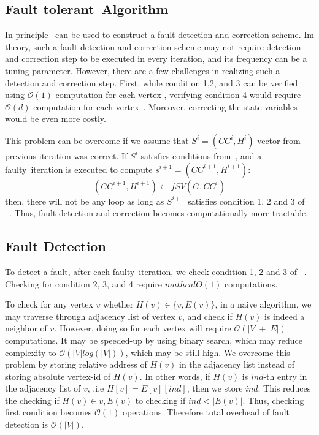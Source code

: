 \subsection{Fault tolerant~\sv Algorithm}
In principle~ can be used to construct a fault detection and correction scheme. 
Im theory,  such a fault detection and correction scheme may not require detection and correction 
step to be executed in every iteration, and its frequency can be a tuning parameter. 
However, there are a few challenges in realizing such a detection and correction step. 
First, while condition 1,2, and 3 can be verified using $\mathcal{O}(1)$ computation for each vertex , verifying
condition 4 would require $\mathcal{O}(d)$ computation for each vertex~\cite{brent1980cycle}. 
Moreover, correcting the state variables would be even more costly. 

This problem can be overcome if we assume that $S^{i}=(CC^{i},H^{i})$ vector from previous iteration was correct.
If $S^{i}$ satisfies conditions from~, and a faulty~\sv iteration
is executed to compute $s^{i+1} = (CC^{i+1},H^{i+1})$:
\[
(CC^{i+1},H^{i+1}) \leftarrow fSV (G,CC^{i}) 
\] 
then, there will not be any loop as long as $S^{i+1}$ satisfies condition 1, 2 and 3 of ~. Thus, fault detection and correction becomes computationally more tractable.


\subsection{Fault Detection}
To detect a fault, after each faulty~\sv iteration, we check condition 1, 2 and 3 of ~. Checking for condition 2, 3, and 4 require $mathcal{O}(1)$ computations. 

 To check for any vertex $v$ whether $H(v) \in \{ v, E(v)\}$, in a naive algorithm, 
we may traverse through adjacency list of vertex $v$, and check if $H(v)$ is indeed a neighbor of $v$. However, doing so for each vertex will require $\mathcal{O}(|V|+|E|)$ computations. It may be speeded-up by using binary search, which may reduce complexity to $\mathcal{O}(|V|log(|V|))$, which may be still high. 
We  overcome this problem by storing relative address of $H(v)$ in the adjacency list instead of storing absolute vertex-id of $H(v)$.
 In other words, if $H(v)$ is $ind$-th entry in the adjacency list of $v$, .i.e $H[v]=E[v][ind]$, 
 then we store $ind$. This reduces the checking if $H(v)\in{v,E(v)}$ to checking if $ind<|E(v)|$.  Thus, checking first condition becomes $\mathcal{O}(1)$ operations. 
 Therefore total overhead of fault detection is  $\mathcal{O}(|V|)$.

